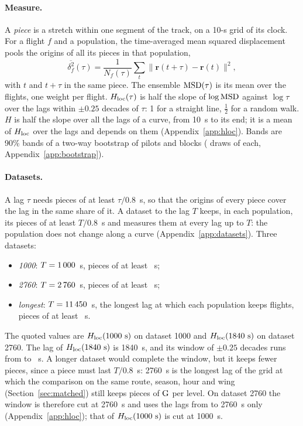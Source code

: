 \paragraph{Measure.} A \emph{piece} is a stretch within one segment of the track, on a 10-s grid of its
clock. For a flight $f$ and a population, the time-averaged mean squared displacement pools the origins of
all its pieces in that population,
\begin{equation}\label{eq:tamsd}
  \overline{\delta^2_f}(\tau)=\frac{1}{N_f(\tau)}\sum_{t}\bigl\|\mathbf r(t+\tau)-\mathbf r(t)\bigr\|^2 ,
\end{equation}
with $t$ and $t+\tau$ in the same piece. The ensemble $\mathrm{MSD}(\tau)$ is its mean over the flights, one weight
per flight. $H_\mathrm{loc}(\tau)$ is half the slope of $\log\mathrm{MSD}$ against $\log\tau$ over the lags within $\pm0.25$
decades of $\tau$: 1 for a straight line, $\tfrac12$ for a random walk. $H$ is half the slope over all the
lags of a curve, from 10~s to its end; it is a mean of $H_\mathrm{loc}$ over the lags and depends on them (Appendix~\ref{app:hloc}). Bands are 90\% bands of a two-way bootstrap of pilots and blocks
(\NBoot{} draws of each, Appendix~\ref{app:bootstrap}).

\paragraph{Datasets.} A lag $\tau$ needs pieces of at least $\tau/0.8$~s, so that the origins of every piece
cover the lag in the same share of it. A dataset to the lag $T$ keeps, in each population, its pieces of at
least $T/0.8$~s and measures them at every lag up to $T$: the population does not change along a curve
(Appendix~\ref{app:datasets}). Three datasets:
\begin{itemize}
  \item \emph{1000}: $T=1\,000$~s, pieces of at least \RawShortestOne~s;
  \item \emph{2760}: $T=2\,760$~s, pieces of at least \RawShortestTwo~s;
  \item \emph{longest}: $T=11\,450$~s, the longest lag at which each population keeps \DeclMinFlights{} flights, pieces of at least \RawShortestLong~s.
\end{itemize}
The quoted values are $H_\mathrm{loc}(1000~\mathrm{s})$ on dataset 1000 and $H_\mathrm{loc}(1840~\mathrm{s})$ on dataset 2760. The lag of $H_\mathrm{loc}(1840~\mathrm{s})$ is 1840~s, and its window of $\pm0.25$ decades
runs from \HqLowest{} to \HqHighest~s. A longer dataset would complete the window, but it keeps fewer pieces, since a piece must last $T/0.8$~s: 2760~s is the
longest lag of the grid at which the comparison on the same route, season, hour and wing (Section~\ref{sec:matched}) still keeps \MatMin{} pieces of $\mathrm{G}$ per level.
On dataset 2760 the window is therefore cut at 2760~s and uses the lags from \HqLowest{} to 2760~s only (Appendix~\ref{app:hloc}); that of $H_\mathrm{loc}(1000~\mathrm{s})$ is cut at 1000~s.

